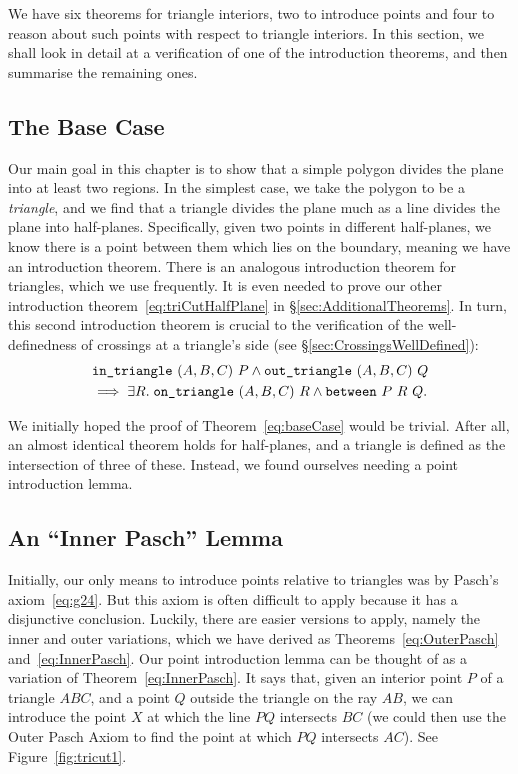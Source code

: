 We have six theorems for triangle interiors, two to introduce points and four to reason about such points with respect to triangle interiors. In this section, we shall look in detail at a verification of one of the introduction theorems, and then summarise the remaining ones.

\subsection{The Base Case}
Our main goal in this chapter is to show that a simple polygon divides the plane into at least two regions. In the simplest case, we take the polygon to be a \emph{triangle}, and we find that a triangle divides the plane much as a line divides the plane into half-planes. Specifically, given two points in different half-planes, we know there is a point between them which lies on the boundary, meaning we have an introduction theorem. There is an analogous introduction theorem for triangles, which we use frequently. It is even needed to prove our other introduction theorem~\eqref{eq:triCutHalfPlane} in \S\ref{sec:AdditionalTheorems}. In turn, this second introduction theorem is crucial to the verification of the well-definedness of crossings at a triangle's side (see \S\ref{sec:CrossingsWellDefined}):
\begin{multline}\label{eq:baseCase}
\texttt{in\_triangle}\ (A,B,C)\ P \wedge \texttt{out\_triangle}\ (A,B,C)\ Q \\\implies \exists R.\; \texttt{on\_triangle}\ (A,B,C)\ R \wedge \texttt{between}\ P\ R\ Q.
\end{multline}

We initially hoped the proof of Theorem~\ref{eq:baseCase} would be trivial. After all, an almost identical theorem holds for half-planes, and a triangle is defined as the intersection of three of these. Instead, we found ourselves needing a point introduction lemma.

\subsection{An ``Inner Pasch'' Lemma}
Initially, our only means to introduce points relative to triangles was by Pasch's axiom~\eqref{eq:g24}. But this axiom is often difficult to apply because it has a disjunctive conclusion. Luckily, there are easier versions to apply, namely the inner and outer variations, which we have derived as Theorems~\ref{eq:OuterPasch} and~\ref{eq:InnerPasch}. Our point introduction lemma can be thought of as a variation of Theorem~\ref{eq:InnerPasch}. It says that, given an interior point $P$ of a triangle $ABC$, and a point $Q$ outside the triangle on the ray $AB$, we can introduce the point $X$ at which the line $PQ$ intersects $BC$ (we could then use the Outer Pasch Axiom to find the point at which $PQ$ intersects $AC$). See Figure~\ref{fig:tricut1}.

